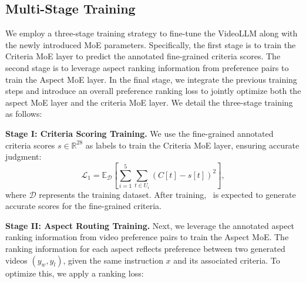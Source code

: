 

\subsection{Multi-Stage Training}\label{sec:moe_training}
We employ a three-stage training strategy to fine-tune the VideoLLM along with the newly introduced MoE parameters. Specifically, the first stage is to train the Criteria MoE layer to predict the annotated fine-grained criteria scores. The second stage is to leverage aspect ranking information from preference pairs to train the Aspect MoE layer. In the final stage, we integrate the previous training steps and introduce an overall preference ranking loss to jointly optimize both the aspect MoE layer and the criteria MoE layer. We detail the three-stage training as follows:

\noindent \textbf{Stage I: Criteria Scoring Training.}
We use the fine-grained annotated criteria scores $s\in \mathbb{R}^{28}$ as labels to train the Criteria MoE layer, ensuring accurate judgment:
\begin{equation}
    \mathcal{L}_1 = \mathbb{E}_{\mathcal{D}} \left [\sum_{i=1}^{5}\sum_{t \in U_i} (C[t] - s[t])^2\right]
    ,
    \label{eq:stage_1}
\end{equation}
where $\mathcal{D}$ represents the training dataset. After training, \algname\ is expected to generate accurate scores for the fine-grained criteria.

\noindent \textbf{Stage II: Aspect Routing Training.}
Next, we leverage the annotated aspect ranking information from video preference pairs to train the Aspect MoE. The ranking information for each aspect reflects preference between two generated videos $(y_w, y_l)$, given the same instruction $x$ and its associated criteria. To optimize this, we apply a ranking loss:

